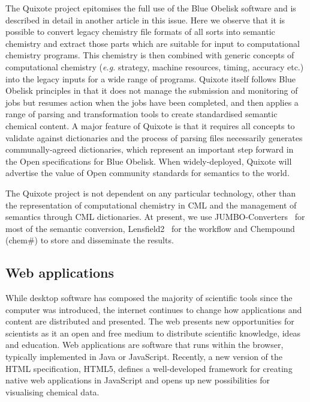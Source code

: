 \documentclass[10pt]{bmc_article}
\newenvironment{bmcformat}{\fussy\setboolean{publ}{true}}{\fussy}
\begin{document}
\begin{bmcformat}
The Quixote project epitomises the full use of the Blue Obelisk
software and is described in detail in another article
in this issue. Here we observe that it is possible
to convert legacy chemistry file formats
of all sorts into semantic chemistry and extract
those parts which are suitable for input to computational chemistry
programs. This chemistry is then combined with
generic concepts of computational chemistry ({\it e.g.} strategy,
machine resources, timing, accuracy etc.) into the
legacy inputs for a wide range of programs. Quixote itself follows
Blue Obelisk principles in that it does not manage
the submission and monitoring of jobs but resumes action when the jobs
have been completed, and then applies a range
of parsing and transformation tools to create standardised semantic
chemical content. A major feature of Quixote is
that it requires all concepts to validate against dictionaries and the
process of parsing files necessarily generates
communally-agreed dictionaries, which represent an important step
forward in the Open specifications for Blue Obelisk.
When widely-deployed, Quixote will advertise the value of Open
community standards for semantics to the world.

The Quixote project is not dependent on any particular technology,
other than the representation of computational
chemistry in CML and the management of semantics through CML
dictionaries. At present, we use JUMBO-Converters~\cite{JUMBO-Convertors} for most
 of the semantic conversion, Lensfield2~\cite{Lensfield2} for the workflow and Chempound
(chem\#) \cite{Chempound} to store and disseminate the results.

\subsection*{Web applications}

While desktop software has composed the majority of scientific tools
since the computer was introduced, the internet continues to change
how applications and content are distributed and presented. The web
presents new opportunities for scientists as it
an open and free medium to distribute scientific knowledge, ideas and
education. Web applications are software that runs within the browser,
typically implemented in Java or JavaScript.
Recently, a new version of the HTML
specification, HTML5, defines a well-developed framework
for creating native web applications in JavaScript and opens up
new possibilities for visualising chemical data.


\end{bmcformat}
\end{document}
